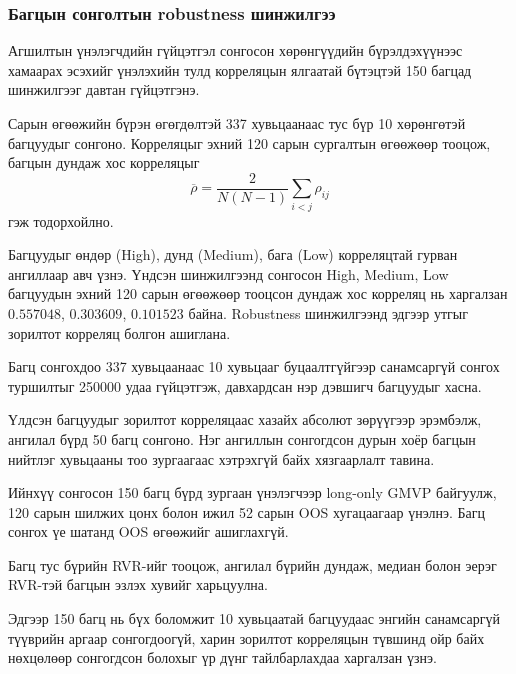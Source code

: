 
\subsubsection{Багцын сонголтын
	robustness шинжилгээ}
\label{subsubsec:portfolio_robustness}

Агшилтын үнэлэгчдийн гүйцэтгэл
сонгосон хөрөнгүүдийн бүрэлдэхүүнээс
хамаарах эсэхийг үнэлэхийн тулд
корреляцын ялгаатай бүтэцтэй
150 багцад шинжилгээг давтан
гүйцэтгэнэ.

Сарын өгөөжийн бүрэн өгөгдөлтэй
337 хувьцаанаас тус бүр 10 хөрөнгөтэй
багцуудыг сонгоно. Корреляцыг
эхний 120 сарын сургалтын өгөөжөөр
тооцож, багцын дундаж хос
корреляцыг
\[
\overline{\rho}
=
\frac{2}{N(N-1)}
\sum_{i<j}\rho_{ij}
\]
гэж тодорхойлно.

Багцуудыг өндөр (High),
дунд (Medium), бага (Low)
корреляцтай гурван ангиллаар
авч үзнэ. Үндсэн шинжилгээнд сонгосон High, Medium,
Low багцуудын эхний 120 сарын өгөөжөөр
тооцсон дундаж хос корреляц нь харгалзан
$0.557048$, $0.303609$, $0.101523$ байна.
Robustness шинжилгээнд эдгээр утгыг
зорилтот корреляц болгон ашиглана.

Багц сонгохдоо 337 хувьцаанаас
10 хувьцааг буцаалтгүйгээр
санамсаргүй сонгох туршилтыг
250000 удаа гүйцэтгэж,
давхардсан нэр дэвшигч
багцуудыг хасна.

Үлдсэн багцуудыг зорилтот
корреляцаас хазайх абсолют
зөрүүгээр эрэмбэлж, ангилал
бүрд 50 багц сонгоно.
Нэг ангиллын сонгогдсон
дурын хоёр багцын нийтлэг
хувьцааны тоо зургаагаас
хэтрэхгүй байх хязгаарлалт
тавина.

Ийнхүү сонгосон 150 багц бүрд
зургаан үнэлэгчээр long-only
GMVP байгуулж, 120 сарын
шилжих цонх болон ижил
52 сарын OOS хугацаагаар
үнэлнэ. Багц сонгох үе шатанд
OOS өгөөжийг ашиглахгүй.

Багц тус бүрийн RVR-ийг тооцож,
ангилал бүрийн дундаж, медиан
болон эерэг RVR-тэй багцын
эзлэх хувийг харьцуулна.

Эдгээр 150 багц нь бүх боломжит
10 хувьцаатай багцуудаас энгийн
санамсаргүй түүврийн аргаар
сонгогдоогүй, харин зорилтот
корреляцын түвшинд ойр байх
нөхцөлөөр сонгогдсон болохыг
үр дүнг тайлбарлахдаа харгалзан үзнэ.


